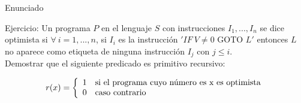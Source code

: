 \documentclass[10pt]{beamer}
\begin{document}
\begin{frame}{Enunciado}

\bigskip



Ejercicio: Un programa $P$ en el lenguaje $S$ con instrucciones $I_1,...,I_n$ se dice optimista si $\forall\ i = 1,...,n$, si $I_i$ es la instrucción $'IF\ V \neq 0$ GOTO $L'$ entonces $L$ no aparece como etiqueta de ninguna instrucción $I_j$ con $j \leq i$.\\




Demostrar que el siguiente predicado es primitivo recursivo:


$$r(x) = \left\{
    \begin{array}{c l}
     1    & \text{si el programa cuyo número es x es optimista}\\
	 0    & \text{caso contrario}
     
    \end{array}
    \right.
    $$

\end{frame}
\end{document}
